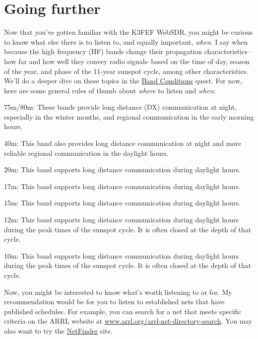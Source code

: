 \documentclass[
  letterpaper,
  DIV=11,
  numbers=noendperiod]{scrreport}
\begin{document}
\hypertarget{going-further}{%
\section*{Going further}\label{going-further}}


Now that you've gotten familiar with the K3FEF WebSDR, you might be
curious to know what else there is to listen to, and equally important,
\emph{when}. I say when because the high frequency (HF) bands change
their propagation characteristics--how far and how well they convey
radio signals--based on the time of day, season of the year, and phase
of the 11-year sunspot cycle, among other characteristics. We'll do a
deeper dive on these topics in the \href{}{Band Conditions} quest. For
now, here are some general rules of thumb about \emph{where} to listen
and \emph{when}:

75m/80m: These bands provide long distance (DX) communication at night,
especially in the winter months, and regional communication in the early
morning hours.

40m: This band also provides long distance communication at night and
more reliable regional communication in the daylight hours.

20m: This band supports long distance communication during daylight
hours.

17m: This band supports long distance communication during daylight
hours.

15m: This band supports long distance communication during daylight
hours.

12m: This band supports long distance communication during daylight
hours during the peak times of the sunspot cycle. It is often closed at
the depth of that cycle.

10m: This band supports long distance communication during daylight
hours during the peak times of the sunspot cycle. It is often closed at
the depth of that cycle.

Now, you might be interested to know what's worth listening to or for.
My recommendation would be for you to listen to established nets that
have published schedules. For example, you can search for a net that
meets specific criteria on the ARRL website at
\href{http://www.arrl.org/arrl-net-directory-search}{www.arrl.org/arrl-net-directory-search}.
You may also want to try the \href{https://netfinder.radio}{NetFinder}
site.
\end{document}
